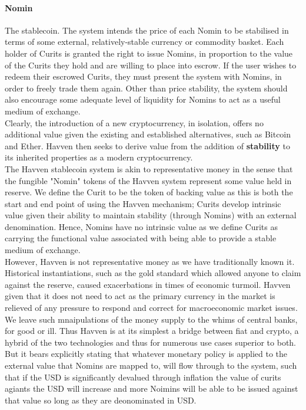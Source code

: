 \documentclass{article}
\begin{document}
\paragraph{Nomin} The stablecoin. The system intends the price of each Nomin to be stabilised in terms of some external, relatively-stable currency or commodity basket. Each holder of Curits is granted the right to issue Nomins, in proportion to the value of the Curits they hold and are willing to place into escrow. If the user wishes to redeem their escrowed Curits, they must present the system with Nomins, in order to freely trade them again. Other than price stability, the system should also encourage some adequate level of liquidity for Nomins to act as a useful medium of exchange. \\

\noindent Clearly, the introduction of a new cryptocurrency, in isolation, offers no additional value given the existing and established alternatives, such as Bitcoin and Ether. Havven then seeks to derive value from the addition of \textbf{stability} to its inherited properties as a modern cryptocurrency. \\

\noindent The Havven stablecoin system is akin to representative money in the sense that the fungible "Nomin" tokens of the Havven system represent some value held in reserve. We define the Curit to be the token of backing value as this is both the start and end point of using the Havven mechanism; Curits develop intrinsic value given their ability to maintain stability (through Nomins) with an external denomination. Hence, Nomins have no intrinsic value as we define Curits as carrying the functional value associated with being able to provide a stable medium of exchange. \\

\noindent However, Havven is not representative money as we have traditionally known it. Historical instantiations, such as the gold standard which allowed anyone to claim against the reserve, caused exacerbations in times of economic turmoil. Havven given that it does not need to act as the primary currency in the market is relieved of any pressure to respond and correct for macroeconomic market issues. We leave such mnaipulations of the money supply to the whims of central banks, for good or ill. Thus Havven is at its simplest a bridge between fiat and crypto, a hybrid of the two technologies and thus for numerous use cases superior to both. But it bears explicitly stating that whatever monetary policy is applied to the external value that Nomins are mapped to, will flow through to the system, such that if the USD is significantly devalued through inflation the value of curits agiants the USD will increase and more Noimins will be able to be issued against that value so long as they are deonominated in USD. \\
\end{document}
